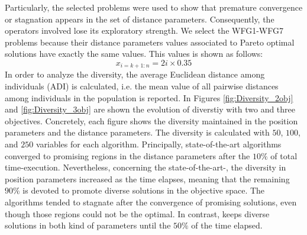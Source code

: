 %
Particularly, the selected problems were used to show that premature convergence or stagnation appears in the set of distance parameters.
%
Consequently, the operators involved lose its exploratory strength.
%
%
%
%
%
%
%
%
We select the WFG1-WFG7 problems because their distance parameters values associated to Pareto optimal solutions have exactly the same values.
%
This values is shown as follows:
\begin{equation}
   x_{i=k+1:n} = 2i \times 0.35
\end{equation}
%
%
%
In order to analyze the diversity, the average Euclidean distance among individuals (ADI) is calculated, i.e. the mean value of all pairwise distances among individuals in the population is reported.
%
In Figures \ref{fig:Diversity_2obj} and \ref{fig:Diversity_3obj} are shown the evolution of diverstiy with two and three objectives.
%
Concretely, each figure shows the diversity maintained in the position parameters and the distance parameters.
%
The diversity is calculated with $50$, $100$, and $250$ variables for each algorithm.
%
Principally, state-of-the-art algorithms converged to promising regions in the distance parameters after the $10\%$ of total time-execution.
%
Nevertheless, concerning the state-of-the-art-\MOEAS{}, the diversity in position parameters increased as the time elapses, meaning that the remaining $90\%$ is devoted to promote diverse solutions in the objective space.
%
The algorithms tended to stagnate after the convergence of promising solutions, even though those regions could not be the optimal.
%
In contrast, \VSDMOEA{} keeps diverse solutions in both kind of parameters until the $50\%$ of the time elapsed.
%


